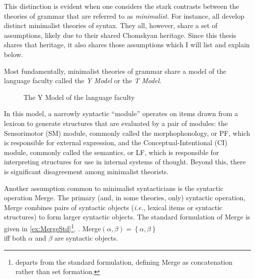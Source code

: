 \documentclass[MilwayThesis]{subfiles}
\begin{document}
This distinction is evident when one considers the stark contrasts between the theories of grammar that are referred to as \textit{minimalist}.
For instance, \textcite{chomsky2000minimalist,hornstein2009theory,frampton2008crash,epstein2006derivations,borer2005name,borer2005normal,borer2013taking} all develop distinct minimalist theories of syntax.
They all, however, share a set of assumptions, likely due to their shared Chomskyan heritage.
Since this thesis shares that heritage, it also shares those assumptions which I will list and explain below.

Most fundamentally, minimalist theories of grammar share a model of the language faculty called the \textit{Y Model} or the \textit{T Model}.
\begin{figure}[h]
	\centering
	\caption{The Y Model of the language faculty}
	\label{fig:YModel}
\end{figure}
In this model, a narrowly syntactic ``module'' operates on items drawn from a lexicon to generate structures that are evaluated by a pair of modules:
the Sensorimotor (SM) module, commonly called the morphophonology, or PF, which is responsible for external expression, and the Conceptual-Intentional (CI) module, commonly called the semantics, or LF, which is responsible for interpreting structures for use in internal systems of thought.
Beyond this, there is significant disagreement among minimalist theorists.

Another assumption common to minimalist syntacticians is the syntactic operation Merge.
The primary (and, in some theories, only) syntactic operation, Merge combines pairs of syntactic objects (\textit{i.e.}, lexical items or syntactic structures) to form larger syntactic objects.
The standard formulation of Merge is given in \cref{ex:MergeStd}\footnote{
	\textcite{hornstein2009theory} departs from the standard formulation, defining Merge as concatenation rather than set formation.
}.
\ex.\label{ex:MergeStd} Merge$(\alpha, \beta) = \left\{ \alpha, \beta \right\}$\\
iff both $\alpha$ and $\beta$ are syntactic objects.
\end{document}
